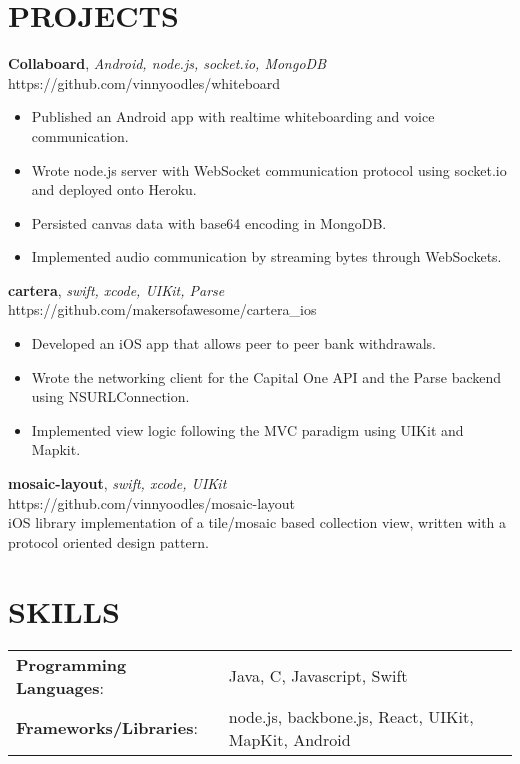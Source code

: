 \documentclass[line,margin]{res}
\begin{document}
\begin{resume}
	\section{PROJECTS}
    \textbf{Collaboard}, {\sl Android, node.js, socket.io, MongoDB}\\ https://github.com/vinnyoodles/whiteboard\\\begin{itemize} \itemsep 1pt
	\item Published an Android app with realtime whiteboarding and voice communication.
	\item Wrote node.js server with WebSocket communication protocol using socket.io and deployed onto Heroku.
	\item Persisted canvas data with base64 encoding in MongoDB.
	\item Implemented audio communication by streaming bytes through WebSockets.
    \end{itemize}
	\textbf{cartera}, {\sl swift, xcode, UIKit, Parse}\\ https://github.com/makersofawesome/cartera\_ios\\\begin{itemize} \itemsep 1pt
	\item Developed an iOS app that allows peer to peer bank withdrawals.
	\item Wrote the networking client for the Capital One API and the Parse backend using NSURLConnection. 
	\item Implemented view logic following the MVC paradigm using UIKit and Mapkit.
	\end{itemize}
	\textbf{mosaic-layout}, {\sl swift, xcode, UIKit}\\ https://github.com/vinnyoodles/mosaic-layout\\iOS library implementation of a tile/mosaic based collection view, written with a protocol oriented design pattern.\\
	\section{SKILLS}
	\begin{tabular}{@{}ll}
		\textbf{Programming Languages}: & Java, C, Javascript, Swift   \\
		\textbf{Frameworks/Libraries}:  & node.js, backbone.js, React, UIKit, MapKit, Android  \\
	\end{tabular}
\end{resume}
\end{document}
